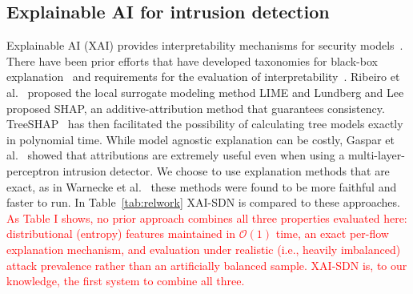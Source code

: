 \documentclass{ieeeaccess}
\begin{document}
\subsection{Explainable AI for intrusion detection}
Explainable AI (XAI) provides interpretability mechanisms for security models~\cite{arrieta2020xai}. There have been prior efforts that have developed taxonomies for black-box explanation~\cite{guidotti2018survey} and requirements for the evaluation of interpretability~\cite{doshivelez2017rigorous}. Ribeiro et al.~\cite{ribeiro2016lime} proposed the local surrogate modeling method LIME and Lundberg and Lee~\cite{lundberg2017shap} proposed SHAP, an additive-attribution method that guarantees consistency. TreeSHAP~\cite{lundberg2020treeshap} has then facilitated the possibility of calculating tree models exactly in polynomial time. While model agnostic explanation can be costly, Gaspar et al.~\cite{gaspar2024xai} showed that attributions are extremely useful even when using a multi-layer-perceptron intrusion detector. We choose to use explanation methods that are exact, as in Warnecke et al.~\cite{warnecke2020evaluating} these methods were found to be more faithful and faster to run. In Table~\ref{tab:relwork} XAI-SDN is compared to these approaches. \textcolor{red}{As Table I shows, no prior approach combines all three properties evaluated here: distributional (entropy) features maintained in $\mathcal{O}(1)$ time, an exact per-flow explanation mechanism, and evaluation under realistic (i.e., heavily imbalanced) attack prevalence rather than an artificially balanced sample. XAI-SDN is, to our knowledge, the first system to combine all three.}

\begin{table}
\caption{Qualitative comparison of XAI-SDN with representative prior approaches.}
\centering
\label{tab:relwork}
\small
\setlength{\tabcolsep}{4.5pt}
\end{table}
\end{document}
